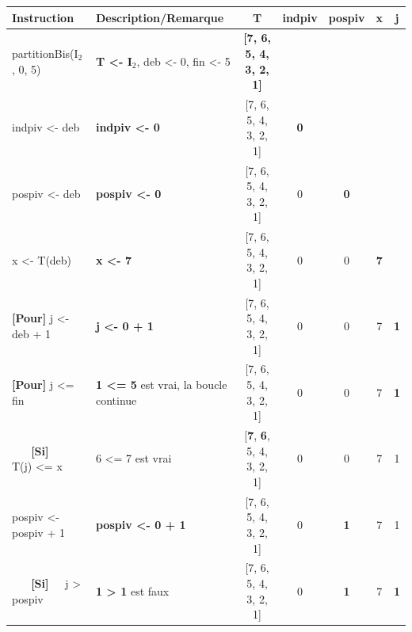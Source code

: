 \documentclass[10pt]{article} %
\newcommand{\asgold}[1]{\textcolor{mygold}{{\bf#1}}}
\newcommand{\asgr}[1]{\textcolor{mygreen}{{\bf#1}}}
\newcommand{\aspurp}[1]{\textcolor{mypurp}{{\bf#1}}}
\begin{document}
\begin{table}[h!]
    \begin{tabular}{ll|ccccc}
    \hline
    Instruction                    & Description/Remarque                                          & T                         & indpiv & pospiv & x & j \\
    \hline
    partitionBis(I$_2$, 0, 5)    & \asgold{T \textless{}- I$_2$},  deb \textless{}- 0, fin \textless{}- 5 & \asgold{{[}7, 6, 5, 4, 3, 2, 1{]}} &        &        &   &   \\
    indpiv \textless{}- deb      & \asgold{indpiv \textless{}- 0}                                                            & {[}7, 6, 5, 4, 3, 2, 1{]} & \asgold{0}      &        &   &   \\
    pospiv \textless{}- deb      & \asgold{pospiv \textless{}- 0}                                                             & {[}7, 6, 5, 4, 3, 2, 1{]} & 0      & \asgold{0}      &   &   \\
    x \textless{}- T(deb)            &        \asgold{x \textless{}- 7}                             & {[}7, 6, 5, 4, 3, 2, 1{]} & 0      & 0      & \asgold{7} &   \\
    \asgr{[Pour]} j \textless{}- deb + 1  &  \asgold{j \textless{}- 0 + 1}                                                              & {[}7, 6, 5, 4, 3, 2, 1{]} & 0      & 0      & 7 & \asgold{1} \\
    \asgr{[Pour]} j \textless{}= fin      & \aspurp{1 \textless{}= 5} est vrai, la boucle continue                 & {[}7, 6, 5, 4, 3, 2, 1{]} & 0      & 0      & 7 & \aspurp{1} \\
    \asgr{\ \ \ [Si]\ \ } T(j) \textless{}= x       & \cellcolor{mypurp} 6 \textless{}= 7 est vrai                                     & {[}\aspurp{7}, \aspurp{6}, 5, 4, 3, 2, 1{]} & 0      & 0      & 7 & 1 \\
    pospiv \textless{}- pospiv + 1 & \asgold{pospiv \textless{}- 0 + 1}                                            & {[}7, 6, 5, 4, 3, 2, 1{]} & 0      & \asgold{1}      & 7 & 1 \\
    \asgr{\ \ \ [Si]\ \ } j \textgreater{} pospiv     & \aspurp{1 \textgreater{} 1} est faux                                     & {[}7, 6, 5, 4, 3, 2, 1{]} & 0      & \aspurp{1}      & 7 & \aspurp{1} \\

\end{tabular}
\end{table}
\end{document}
